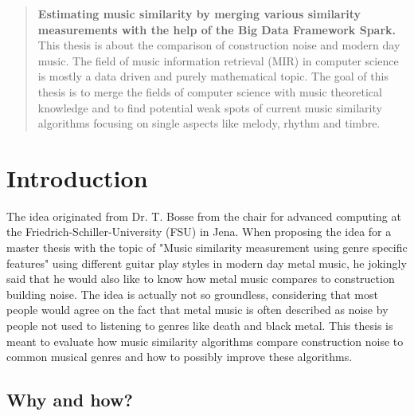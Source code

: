 \begin{abstract}
	\noindent \textbf{Estimating music similarity by merging various similarity measurements with the help of the Big Data Framework Spark.}\\
	This thesis is about the comparison of construction noise and modern day music. 
	The field of music information retrieval (MIR) in computer science is mostly a data driven and purely mathematical topic. The goal of this thesis is to merge the fields of computer science with music theoretical knowledge and to find potential weak spots of current music similarity algorithms focusing on single aspects like melody, rhythm and timbre. 

\end{abstract}


\mainmatter %

\chapter{Introduction}

The idea originated from Dr. T. Bosse from the chair for advanced computing at the Friedrich-Schiller-University (FSU) in Jena. When proposing the idea for a master thesis with the topic of "Music similarity measurement using genre specific features" using different guitar play styles in modern day metal music, he jokingly said that he would also like to know how metal music compares to construction building noise.
The idea is actually not so groundless, considering that most people would agree on the fact that metal music is often described as noise by people not used to listening to genres like death and black metal.
This thesis is meant to evaluate how music similarity algorithms compare construction noise to common musical genres and how to possibly improve these algorithms.

\section{Why and how?}

